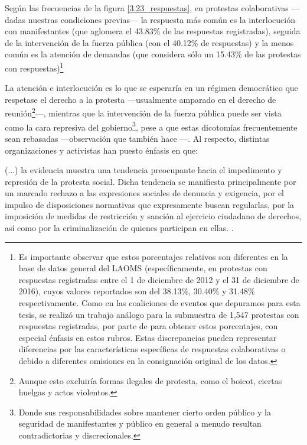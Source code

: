 \documentclass[letterpaper, 11pt]{book}
\theoremstyle{definition}
\theoremstyle{remark}
\begin{document}
Según las frecuencias de la figura \ref{3.23_respuestas}, en protestas colaborativas ---dadas nuestras condiciones previas--- la respuesta más común es la interlocución con manifestantes (que aglomera el 43.83\% de las respuestas registradas), seguida de la intervención de la fuerza pública (con el 40.12\% de respuestas) y la menos común es la atención de demandas (que considera sólo un 15.43\% de las protestas con respuestas)\footnote{
    Es importante observar que estos porcentajes relativos son diferentes en la base de datos general del LAOMS (específicamente, en protestas con respuestas registradas entre el 1 de diciembre de 2012 y el 31 de diciembre de 2016), cuyos valores reportados son del 38.13\%, 30.40\% y 31.48\% respectivamente. 
    Como en las coaliciones de eventos que depuramos para esta tesis, se realizó un trabajo análogo para la submuestra de 1,547 protestas con respuestas registradas, por parte de  \citet{2017_Rob_Respuestas} para obtener estos porcentajes, con especial énfasis en estos rubros. 
    Estas discrepancias pueden representar diferencias por las características específicas de respuestas colaborativas o debido a diferentes omisiones en la consignación original de los datos. 
}


La atención e interlocución es lo que se esperaría en un régimen democrático que respetase el derecho a la protesta ---usualmente amparado en el derecho de reunión\footnote{
    Aunque esto excluiría formas ilegales de protesta, como el boicot, ciertas huelgas y actos violentos. 
}---, mientras que la intervención de la fuerza pública puede ser vista como la cara represiva del gobierno\footnote{
    Donde sus responsabilidades sobre mantener cierto orden público y la seguridad de manifestantes y público en general a menudo resultan contradictorias y discrecionales. 
}, pese a que estas dicotomías frecuentemente sean rebasadas ---observación que también hace \citet{2017_Rob_Respuestas}---. 
Al respecto, distintas organizaciones y activistas han puesto énfasis en que:
\begin{center}
    \begin{minipage}{0.9\linewidth}
        {\setlength{\parindent}{12pt}\small
	    (...) la evidencia muestra una tendencia preocupante hacia el impedimento y represión de la protesta social. 
	    Dicha tendencia se manifiesta principalmente por un marcado rechazo a las expresiones sociales de denuncia y exigencia, por el impulso de disposiciones normativas que expresamente buscan regularlas, por la imposición de medidas de restricción y sanción al ejercicio ciudadano de derechos, así como por la criminalización de quienes participan en ellas. \normalsize \citep[7]{2015_LibertadExpresion_Represion}.
        }
    \end{minipage}
\end{center}
\end{document}

